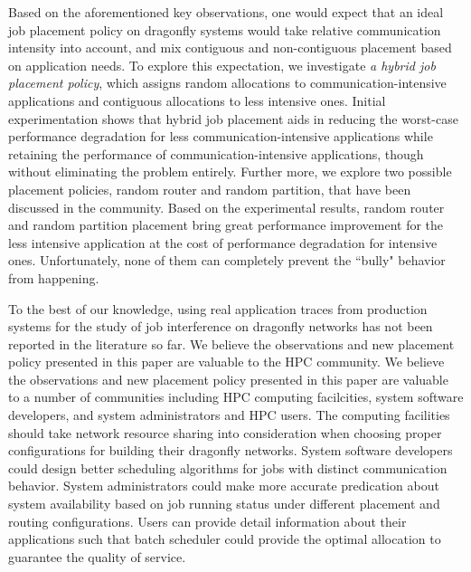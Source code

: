 Based on the aforementioned key observations, one would expect that an ideal job placement policy on dragonfly systems would take relative communication intensity into account, and mix contiguous and non-contiguous placement based on application needs. To explore this expectation, we investigate \emph{a hybrid job placement policy}, which assigns random allocations to communication-intensive applications and contiguous allocations to less intensive ones. Initial experimentation shows that hybrid job placement aids in reducing the worst-case performance degradation for less communication-intensive applications while retaining the performance of communication-intensive applications, though without eliminating the problem entirely. Further more, we explore two possible placement policies, random router and random partition, that have been discussed in the community. Based on the experimental results, random router and random partition placement bring great performance improvement for the less intensive application at the cost of performance degradation for intensive ones. Unfortunately, none of them can completely prevent the ``bully" behavior from happening. 

To the best of our knowledge, using real application traces from production systems for the study of job interference on dragonfly networks has not been reported in the literature so far. We believe the observations and new placement policy presented in this paper are valuable to the HPC community.
We believe the observations and new placement policy presented in this paper are valuable to a number of communities including HPC computing facilcities, system software developers, and system administrators and HPC users. 
The computing facilities should take network resource sharing into consideration when choosing proper configurations for building their dragonfly networks. System software developers could design better scheduling algorithms for jobs with distinct communication behavior. System administrators could make more accurate predication about system availability based on job running status under different placement and routing configurations. Users can provide detail information about their applications such that batch scheduler could provide the optimal allocation to guarantee the quality of service. 


